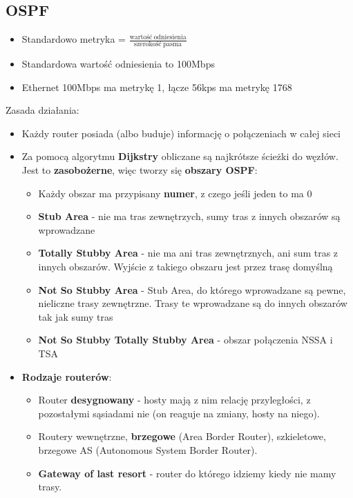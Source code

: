 \documentclass[main.tex]{subfiles}
\begin{document}
    \subsection{OSPF}
    \begin{itemize}[noitemsep]
        \item Standardowo metryka = $\frac{\mathrm{wartość\ odniesienia}}{\mathrm{szerokość\ pasma}}$
        \item Standardowa wartość odniesienia to 100Mbps
        \item Ethernet 100Mbps ma metrykę 1, łącze 56kps ma metrykę 1768
    \end{itemize}

    \noindent Zasada działania:
    \begin{itemize}[noitemsep]
        \item Każdy router posiada (albo buduje) informację o połączeniach w całej sieci

        \item Za pomocą algorytmu \textbf{Dijkstry} obliczane są najkrótsze ścieżki do węzłów. Jest to
        \textbf{zasobożerne}, więc tworzy się \textbf{obszary OSPF}:
        \begin{itemize}[noitemsep]
            \item Każdy obszar ma przypisany \textbf{numer}, z czego jeśli jeden to ma 0
            \item \textbf{Stub Area} - nie ma tras zewnętrzych, sumy tras z innych obszarów są wprowadzane
            \item \textbf{Totally Stubby Area} - nie ma ani tras zewnętrznych, ani sum tras z innych obszarów.
            Wyjście z takiego obszaru jest przez trasę domyślną
            \item \textbf{Not So Stubby Area} - Stub Area, do którego wprowadzane są pewne, nieliczne trasy
            zewnętrzne. Trasy te wprowadzane są do innych obszarów tak jak sumy tras
            \item \textbf{Not So Stubby Totally Stubby Area} - obszar połączenia NSSA i TSA
        \end{itemize}

        \item \textbf{Rodzaje routerów}:
        \begin{itemize}
            \item Router \textbf{desygnowany} - hosty mają z nim relację przyległości, z pozostałymi sąsiadami nie (on
            reaguje na zmiany, hosty na niego).
            \item Routery wewnętrzne, \textbf{brzegowe} (Area Border Router), szkieletowe, brzegowe AS (Autonomous System
            Border Router).
            \item \textbf{Gateway of last resort} - router do którego idziemy kiedy nie mamy trasy.
        \end{itemize}


\end{itemize}
\end{document}
